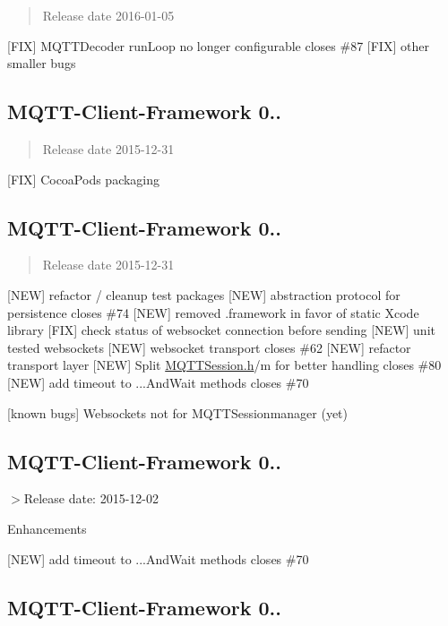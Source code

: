 \begin{quote}
Release date 2016-\/01-\/05 \end{quote}


\mbox{[}F\+IX\mbox{]} M\+Q\+T\+T\+Decoder run\+Loop no longer configurable closes \#87 \mbox{[}F\+IX\mbox{]} other smaller bugs

\subsection*{M\+Q\+T\+T-\/\+Client-\/\+Framework 0..}

\begin{quote}
Release date 2015-\/12-\/31 \end{quote}


\mbox{[}F\+IX\mbox{]} Cocoa\+Pods packaging

\subsection*{M\+Q\+T\+T-\/\+Client-\/\+Framework 0..}

\begin{quote}
Release date 2015-\/12-\/31 \end{quote}


\mbox{[}N\+EW\mbox{]} refactor / cleanup test packages \mbox{[}N\+EW\mbox{]} abstraction protocol for persistence closes \#74 \mbox{[}N\+EW\mbox{]} removed .framework in favor of static Xcode library \mbox{[}F\+IX\mbox{]} check status of websocket connection before sending \mbox{[}N\+EW\mbox{]} unit tested websockets \mbox{[}N\+EW\mbox{]} websocket transport closes \#62 \mbox{[}N\+EW\mbox{]} refactor transport layer \mbox{[}N\+EW\mbox{]} Split \hyperlink{_m_q_t_t_session_8h_source}{M\+Q\+T\+T\+Session.\+h}/m for better handling closes \#80 \mbox{[}N\+EW\mbox{]} add timeout to ...And\+Wait methods closes \#70

\mbox{[}known bugs\mbox{]} Websockets not for M\+Q\+T\+T\+Sessionmanager (yet)

\subsection*{M\+Q\+T\+T-\/\+Client-\/\+Framework 0..}

$>$Release date\+: 2015-\/12-\/02

Enhancements

\mbox{[}N\+EW\mbox{]} add timeout to ...And\+Wait methods closes \#70

\subsection*{M\+Q\+T\+T-\/\+Client-\/\+Framework 0..}


